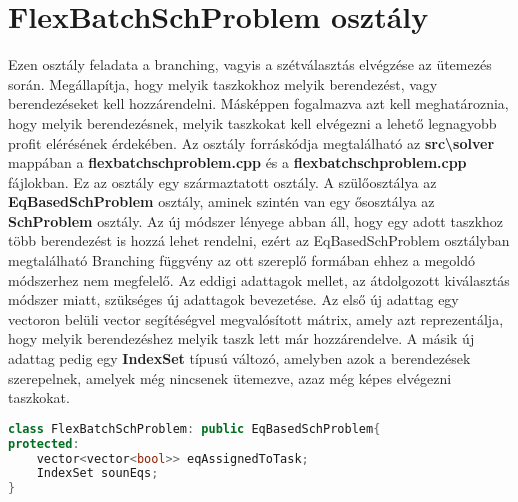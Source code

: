 \section{FlexBatchSchProblem osztály}
Ezen osztály feladata a branching, vagyis a szétválasztás elvégzése az ütemezés során. Megállapítja, hogy melyik taszkokhoz melyik berendezést, vagy berendezéseket kell hozzárendelni. Másképpen fogalmazva azt kell meghatároznia, hogy melyik berendezésnek, melyik taszkokat kell elvégezni a lehető legnagyobb profit elérésének érdekében. Az osztály forráskódja megtalálható az \textbf{src\textbackslash solver} mappában a \textbf{flexbatchschproblem.cpp} és a \textbf{flexbatchschproblem.cpp} fájlokban. Ez az osztály egy származtatott osztály. A szülőosztálya az \textbf{EqBasedSchProblem} osztály, aminek szintén van egy ősosztálya az \textbf{SchProblem} osztály. Az új módszer lényege abban áll, hogy egy adott taszkhoz több berendezést is hozzá lehet rendelni, ezért az EqBasedSchProblem osztályban megtalálható Branching függvény az ott szereplő formában ehhez a megoldó módszerhez nem megfelelő. Az eddigi adattagok mellet, az átdolgozott kiválasztás módszer miatt, szükséges új adattagok bevezetése. Az első új adattag egy vectoron belüli vector segítéségvel megvalósított mátrix, amely azt reprezentálja, hogy melyik berendezéshez melyik taszk lett már hozzárendelve. A másik új adattag pedig egy \textbf{IndexSet} típusú változó, amelyben azok a berendezések szerepelnek, amelyek még nincsenek ütemezve, azaz még képes elvégezni taszkokat.
\newpage
\begin{lstlisting}[language=C++, title={FlexBatchSchProblem adattagjai}]
class FlexBatchSchProblem: public EqBasedSchProblem{
protected:
	vector<vector<bool>> eqAssignedToTask;
    IndexSet sounEqs;
}
\end{lstlisting}
